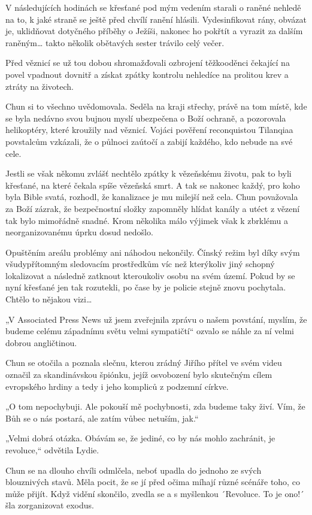 V následujících hodinách se křesťané pod mým vedením starali o raněné nehledě na to, k jaké straně se ještě před chvílí ranění hlásili. Vydesinfikovat rány, obvázat je, uklidňovat dotyčného příběhy o Ježíši, nakonec ho pokřtít a vyrazit za dalším raněným… takto několik obětavých sester trávilo celý večer. 

Před věznicí se už tou dobou shromažďovali ozbrojení těžkooděnci čekající na povel vpadnout dovnitř a získat zpátky kontrolu nehledíce na prolitou krev a ztráty na životech.	

Chun si to všechno uvědomovala. Seděla na kraji střechy, právě na tom místě, kde se byla nedávno svou bujnou myslí ubezpečena o Boží ochraně, a pozorovala helikoptéry, které kroužily nad věznicí. Vojáci pověření reconquistou Tilanqiaa povstalcům vzkázali, že o půlnoci zaútočí a zabijí každého, kdo nebude na své cele.

Jestli se však někomu zvlášť nechtělo zpátky k vězeňskému životu, pak to byli křesťané, na které čekala spíše vězeňská smrt. A tak se nakonec každý, pro koho byla Bible svatá, rozhodl, že kanalizace je mu milejší než cela. Chun považovala za Boží zázrak, že bezpečnostní složky zapomněly hlídat kanály a utéct z vězení tak bylo mimořádně snadné. Krom několika málo výjimek však k zbrklému a neorganizovanému úprku dosud nedošlo.

Opuštěním areálu problémy ani náhodou nekončily. Čínský režim byl díky svým všudypřítomným sledovacím prostředkům víc než kterýkoliv jiný schopný lokalizovat a následně zatknout kteroukoliv osobu na svém území. Pokud by se nyní křesťané jen tak rozutekli, po čase by je policie stejně znovu pochytala. Chtělo to nějakou vizi…    

„V Associated Press News už jsem zveřejnila zprávu o našem povstání, myslím, že budeme celému západnímu světu velmi sympatičtí“ ozvalo se náhle za ní velmi dobrou angličtinou.	

Chun se otočila a poznala slečnu, kterou zrádný Jiřího přítel ve svém videu označil za skandinávskou špiónku, jejíž osvobození bylo skutečným cílem evropského hrdiny a tedy i jeho kompliců z podzemní církve.

„O tom nepochybuji. Ale pokouší mě pochybnosti, zda budeme taky živí. Vím, že Bůh se o nás postará, ale zatím vůbec netuším, jak.“

„Velmi dobrá otázka. Obávám se, že jediné, co by nás mohlo zachránit, je revoluce,“ odvětila Lydie.

Chun se na dlouho chvíli odmlčela, neboť upadla do jednoho ze svých blouznivých stavů. Měla pocit, že se jí před očima míhají různé scénáře toho, co může přijít. Když vidění skončilo, zvedla se a s myšlenkou ´Revoluce. To je ono!´ šla zorganizovat exodus.
